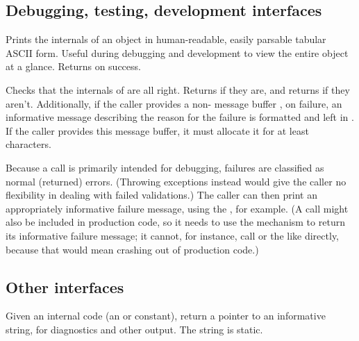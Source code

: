 \subsection{Debugging, testing, development interfaces}

\begin{sreapi}
\hypertarget{ifc:Dump}
{\item[\ccode{\_Dump*(FILE *fp, obj...)}]}

Prints the internals of an object in human-readable, easily parsable
tabular ASCII form. Useful during debugging and development to view
the entire object at a glance. Returns  on success.

\hypertarget{ifc:Validate}
{\item[\ccode{\_Validate*(obj, errbuf...)}]}

Checks that the internals of  are all right. Returns
 if they are, and returns  if they
aren't. Additionally, if the caller provides a non-
message buffer , on failure, an informative message
describing the reason for the failure is formatted and left in
. If the caller provides this message buffer, it must
allocate it for at least  characters.

Because a  call is primarily intended for
debugging, failures are classified as normal (returned) errors.
(Throwing exceptions instead would give the caller no flexibility in
dealing with failed validations.) The caller can then print an
appropriately informative failure message, using the ,
for example. (A  call might also be included in
production code, so it needs to use the  mechanism to
return its informative failure message; it cannot, for instance, call
 or the like directly, because that would mean
crashing out of production code.)

\end{sreapi}



\subsection{Other interfaces}

\begin{sreapi}
\hypertarget{ifc:Describe}
{\item[\ccode{\_DescribeXXX()}]}

Given an internal code (an  or  constant),
return a pointer to an informative string, for diagnostics and other
output. The string is static.
\end{sreapi}





